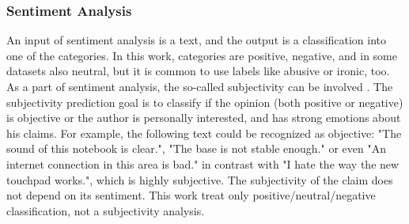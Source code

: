 \subsubsection{Sentiment Analysis}
An input of sentiment analysis is a text, and the output is a classification into one of the categories. In this work, categories are positive, negative, and in some datasets also neutral, but it is common to use labels like abusive or ironic, too.
As a part of sentiment analysis, the so-called subjectivity can be involved \citep{Montoyo2012}. The subjectivity prediction goal is to classify if the
opinion (both positive or negative) is objective or the author is personally interested,  and has strong emotions about his claims. For example, the following text could be recognized as objective: "The sound of this notebook is clear.", "The base is not stable enough." or even "An internet connection in this area is bad." in contrast with "I hate the way the new touchpad works.", which is highly subjective. The subjectivity of the claim does not depend on its sentiment. This work treat only positive/neutral/negative classification, not a subjectivity analysis.

